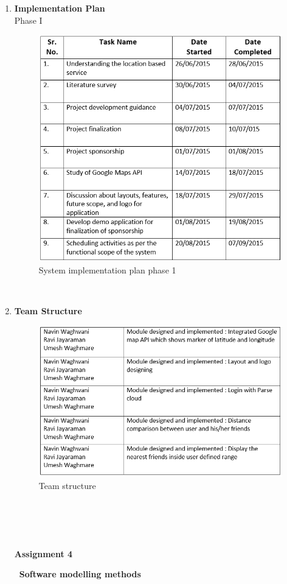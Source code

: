 \begin{enumerate}
\begin{enumerate}
\end{enumerate}
\\
\item\textbf{Implementation Plan }\\
Phase I\\
\begin{figure}[hbtp]
\centering
\includegraphics[scale=0.775]{implementationPlan.png}
\caption{System implementation plan phase 1}
\end{figure}\\
\pagebreak
\item\textbf{Team Structure}\\
\begin{figure}[hbtp]
\centering
\includegraphics[scale=0.825]{teamStructure.png}
\caption{Team structure}
\end{figure}\\
\\
\\
\pagebreak
\\
\hspace*{2.125 in}\textbf{\large Assignment 4}\\
\begin{flushleft}
\textbf{\ Software modelling methods}\\
\end{flushleft}


\end{enumerate}
